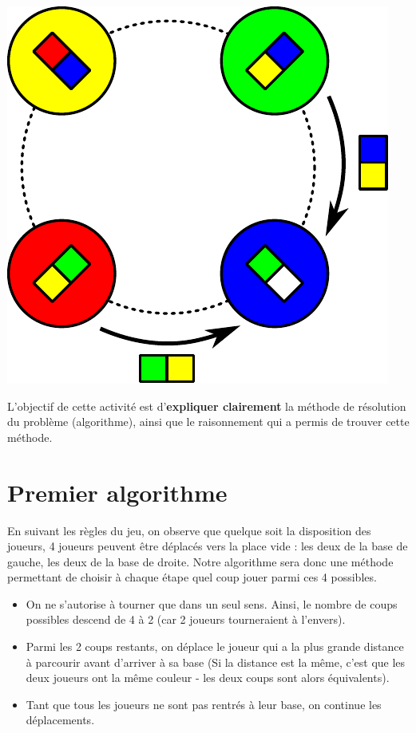 \documentclass[a5paper,pagesize,DIV=14]{scrbook}
\begin{document}
\begin{center}
  \includegraphics[width=0.3\linewidth]{img/baseball_coup.pdf}
\end{center}


L'objectif de cette activité est d'\textbf{expliquer clairement} la méthode de résolution du problème (algorithme), ainsi que le raisonnement qui a permis de trouver cette méthode.

\newpage

\section*{Premier algorithme}

En suivant les règles du jeu, on observe que quelque soit la disposition des joueurs, 4 joueurs peuvent être déplacés vers la place vide : les deux de la base de gauche, les deux de la base de droite. Notre algorithme sera donc une méthode permettant de choisir à chaque étape quel coup jouer parmi ces 4 possibles.

\begin{itemize}
  \item On ne s'autorise à tourner que dans un seul sens. Ainsi, le nombre de coups possibles descend de 4 à 2 (car 2 joueurs tourneraient à l'envers).
  \item Parmi les 2 coups restants, on déplace le joueur qui a la plus grande distance à parcourir avant d'arriver à sa base (Si la distance est la même, c'est que les deux joueurs ont la même couleur - les deux coups sont alors équivalents).
  \item Tant que tous les joueurs ne sont pas rentrés à leur base, on continue les déplacements.
\end{itemize}
\end{document}
